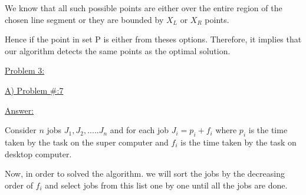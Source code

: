 \documentclass[letterpaper,portrait,12pt]{article}
\begin{document}
\begin{flushleft}
We know that all such possible points are either over the entire region of the chosen line segment or they are bounded by $X_L$ or $X_R$ points.
\end{flushleft}


\begin{flushleft}
Hence if the point in set P is either from theses options. Therefore, it implies that our algorithm detects the same points as the optimal solution.
\end{flushleft}


\begin{flushleft}

\end{flushleft}


\begin{flushleft}

\end{flushleft}


\begin{flushleft}
\uline{\newpage
}
\end{flushleft}


\begin{flushleft}
\uline{Problem 3:}
\end{flushleft}


\begin{flushleft}
\uline{A) Problem \#:7 }
\end{flushleft}


\begin{flushleft}
\uline{Answer: }
\end{flushleft}


\begin{flushleft}
Consider $n$ jobs $J_1,J_2,.....J_n$ and for each job $J_i = p_i + f_i$ where $p_i$ is the time taken by the task on the super computer and $f_i$ is the time taken by the task on desktop computer.
\end{flushleft}


\begin{flushleft}

\end{flushleft}


\begin{flushleft}
Now, in order to solved the algorithm. we will sort the jobs by the decreasing order of $f_i$ and select jobs from this list one by one until all the jobs are done.
\end{flushleft}


\begin{flushleft}

\end{flushleft}
\end{document}
